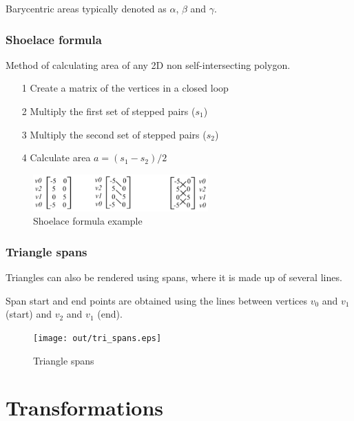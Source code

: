 \documentclass[a4paper]{article}
\begin{document}
Barycentric areas typically denoted as $\alpha$, $\beta$ and $\gamma$.

\subsubsection{Shoelace formula}

Method of calculating area of any 2D non self-intersecting polygon.

\begin{enumerate}
  \item[1] Create a matrix of the vertices in a closed loop
  \item[2] Multiply the first set of stepped pairs ($s_{1}$)
  \item[3] Multiply the second set of stepped pairs ($s_{2}$)
  \item[4] Calculate area $a = (s_{1}- s_{2}) / 2$
\end{enumerate}

\begin{figure}[h!]
  \centering
  \includegraphics[width=0.6\textwidth]{graphics/shoelace_formula.eps}
  \caption{Shoelace formula example}
  \label{fig:shoelace_formula}
\end{figure}
\FloatBarrier

\subsubsection{Triangle spans}

Triangles can also be rendered using spans, where it is made up of several
lines.

Span start and end points are obtained using the lines between vertices $v_{0}$
and $v_{1}$ (start) and $v_{2}$ and $v_{1}$ (end).

\begin{figure}[h!]
  \centering
  \texttt{[image: out/tri\_spans.eps]}
  \caption{Triangle spans}
  \label{fig:tri_spans}
\end{figure}
\FloatBarrier

\section{Transformations}
\label{sec:transformations}
\end{document}
